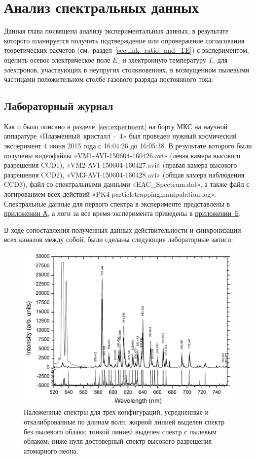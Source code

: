 \chapter{Анализ спектральных данных}
\label{cha:ch_5}

Данная глава посвящена анализу экспериментальных данных, в результате которого планируется
получить подтверждение или опровержение согласования теоретических расчетов (см.~раздел~\ref{sec:link_ratio_and_TE})
с экспериментом, оценить осевое электрическое поле $E_z$ и электронную температуру $T_e$ для электронов, участвующих
в неупругих столкновениях, в возмущенном пылевыми частицами положительном столбе газового разряда
постоянного тока.
\section{Лабораторный журнал}

Как и было описано в разделе~\ref{sec:experiment} на борту МКС на научной аппаратуре «Плазменный~кристалл~-~4»
был проведен нужный космический эксперимент 4 июня 2015 года с 16:04:26 до 16:05:38. В результате которого были
получены видеофайлы «VM1-AVI-150604-160426.avi» (левая камера высокого разрешения CCD1),
«VM2-AVI-150604-160427.avi» (правая камера высокого разрешения CCD2), «VM3-AVI-150604-160428.avi» (общая камера наблюдения CCD3),
файл со спектральными данными «EAC\_Spectrum.dat», а также файл с логированием всех действий «PK4-particletrappingmanipulation.log».
Спектральные данные для первого спектра в эксперименте представлены в \hyperref[app:app1]{приложении А},
а логи за все время эксперимента приведены в \hyperref[app:app2]{приложении~Б}.

В ходе сопоставления полученных данных действительности и синхронизации всех каналов между собой, были сделаны
следующие лабораторные записи:

\begin{figure}[t]
    \centering
    \includegraphics[width=16cm]{figures/main_spectrum}
    \caption{
        Наложенные спектры для трех конфигураций, усредненные и откалиброванные по длинам волн:
        жирной линией выделен спектр без пылевого облака; тонкой линией выделен спектр с пылевым облаком;
        ниже нуля достоверный спектр высокого разрешения атомарного неона.
    }
    \label{fig:main_spectrum}
\end{figure}

